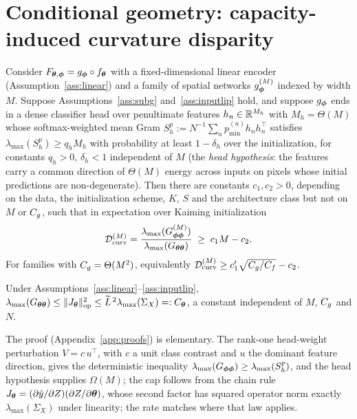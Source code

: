 \section{Conditional geometry: capacity-induced curvature disparity}
\label{sec:geometry}

\begin{theorem}
\label{thm:hessian}
Consider $F_{{\boldsymbol{\theta}},{\boldsymbol{\phi}}}=g_{\boldsymbol{\phi}}\circ f_{\boldsymbol{\theta}}$ with a fixed-dimensional
linear encoder (Assumption~\ref{ass:linear}) and a family of spatial
networks $g^{(M)}_{\boldsymbol{\phi}}$ indexed by width $M$. Suppose
Assumptions~\ref{ass:subg} and~\ref{ass:inputlip} hold, and suppose
$g_{\boldsymbol{\phi}}$ ends in a dense classifier head over penultimate features
$h_n\in\mathbb{R}^{M_h}$ with $M_h=\Theta(M)$ whose softmax-weighted mean Gram
$S_h^p:=N^{-1}\sum_n p^{(n)}_{\min}h_nh_n^\top$ satisfies
$\lambda_{\max}(S_h^p)\ge q_hM_h$ with probability at least $1-\delta_h$
over the initialization, for constants $q_h>0$, $\delta_h<1$ independent
of $M$ (the \emph{head hypothesis}: the features carry a common direction of
$\Theta(M)$ energy across inputs on pixels whose initial predictions are
non-degenerate). Then there are constants $c_1,c_2>0$, depending on the
data, the initialization scheme, $K$, $S$ and the architecture class but not
on $M$ or $C_g$, such that in expectation over Kaiming initialization
\[
  \mathcal{D}_{\mathrm{curv}}^{(M)}
  =\frac{\lambda_{\max}(G^{(M)}_{{\boldsymbol{\phi}}{\boldsymbol{\phi}}})}{\lambda_{\max}(G_{{\boldsymbol{\theta}}{\boldsymbol{\theta}}})}
  \;\ge\; c_1M-c_2 .
\]
For families with $C_g=\Theta(M^2)$, equivalently
$\mathcal{D}_{\mathrm{curv}}^{(M)}\ge c_1'\sqrt{C_g/C_f}-c_2$.
\end{theorem}

\begin{lemma}
\label{lem:opcap}
Under Assumptions~\ref{ass:linear}--\ref{ass:inputlip},
$\lambda_{\max}(G_{{\boldsymbol{\theta}}{\boldsymbol{\theta}}})\le\|J_{\boldsymbol{\theta}}\|_{\mathrm{op}}^2
\le\widetilde L^{\,2}\lambda_{\max}(\Sigma_X)=:C_{\boldsymbol{\theta}}$, a constant
independent of $M$, $C_g$ and $N$.
\end{lemma}

The proof (Appendix~\ref{app:proofs}) is elementary. The rank-one
head-weight perturbation $V=c\,u^\top$, with $c$ a unit class contrast and
$u$ the dominant feature direction, gives the deterministic inequality
$\lambda_{\max}(G_{{\boldsymbol{\phi}}{\boldsymbol{\phi}}})\ge\lambda_{\max}(S_h^p)$, and the head
hypothesis supplies $\Omega(M)$; the cap follows from the chain rule
$J_{\boldsymbol{\theta}}=(\partial\hat y/\partial Z)(\partial Z/\partial{\boldsymbol{\theta}})$, whose
second factor has squared operator norm exactly $\lambda_{\max}(\Sigma_X)$
under linearity; the rate matches \citet{karakida2019universal} where that
law applies.

